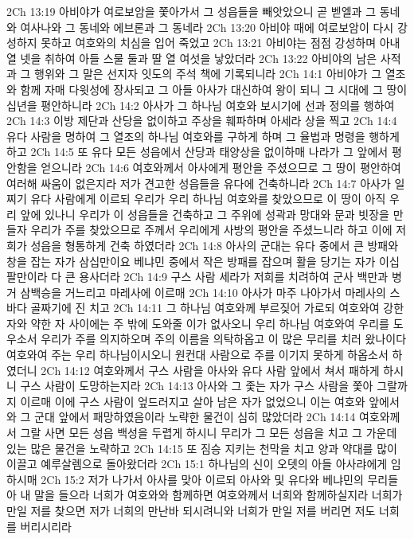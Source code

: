 2Ch 13:19  아비야가 여로보암을 쫓아가서 그 성읍들을 빼앗았으니 곧 벧엘과 그 동네와 여사나와 그 동네와 에브론과 그 동네라
2Ch 13:20  아비야 때에 여로보암이 다시 강성하지 못하고 여호와의 치심을 입어 죽었고
2Ch 13:21  아비야는 점점 강성하며 아내 열 넷을 취하여 아들 스물 둘과 딸 열 여섯을 낳았더라
2Ch 13:22  아비야의 남은 사적과 그 행위와 그 말은 선지자 잇도의 주석 책에 기록되니라
2Ch 14:1  아비야가 그 열조와 함께 자매 다윗성에 장사되고 그 아들 아사가 대신하여 왕이 되니 그 시대에 그 땅이 십년을 평안하니라
2Ch 14:2  아사가 그 하나님 여호와 보시기에 선과 정의를 행하여
2Ch 14:3  이방 제단과 산당을 없이하고 주상을 훼파하며 아세라 상을 찍고
2Ch 14:4  유다 사람을 명하여 그 열조의 하나님 여호와를 구하게 하며 그 율법과 명령을 행하게 하고
2Ch 14:5  또 유다 모든 성읍에서 산당과 태양상을 없이하매 나라가 그 앞에서 평안함을 얻으니라
2Ch 14:6  여호와께서 아사에게 평안을 주셨으므로 그 땅이 평안하여 여러해 싸움이 없은지라 저가 견고한 성읍들을 유다에 건축하니라
2Ch 14:7  아사가 일찌기 유다 사람에게 이르되 우리가 우리 하나님 여호와를 찾았으므로 이 땅이 아직 우리 앞에 있나니 우리가 이 성읍들을 건축하고 그 주위에 성곽과 망대와 문과 빗장을 만들자 우리가 주를 찾았으므로 주께서 우리에게 사방의 평안을 주셨느니라 하고 이에 저희가 성읍을 형통하게 건축 하였더라
2Ch 14:8  아사의 군대는 유다 중에서 큰 방패와 창을 잡는 자가 삼십만이요 베냐민 중에서 작은 방패를 잡으며 활을 당기는 자가 이십 팔만이라 다 큰 용사더라
2Ch 14:9  구스 사람 세라가 저희를 치려하여 군사 백만과 병거 삼백승을 거느리고 마레사에 이르매
2Ch 14:10  아사가 마주 나아가서 마레사의 스바다 골짜기에 진 치고
2Ch 14:11  그 하나님 여호와께 부르짖어 가로되 여호와여 강한 자와 약한 자 사이에는 주 밖에 도와줄 이가 없사오니 우리 하나님 여호와여 우리를 도우소서 우리가 주를 의지하오며 주의 이름을 의탁하옵고 이 많은 무리를 치러 왔나이다 여호와여 주는 우리 하나님이시오니 원컨대 사람으로 주를 이기지 못하게 하옵소서 하였더니
2Ch 14:12  여호와께서 구스 사람을 아사와 유다 사람 앞에서 쳐서 패하게 하시니 구스 사람이 도망하는지라
2Ch 14:13  아사와 그 좇는 자가 구스 사람을 쫓아 그랄까지 이르매 이에 구스 사람이 엎드러지고 살아 남은 자가 없었으니 이는 여호와 앞에서와 그 군대 앞에서 패망하였음이라 노략한 물건이 심히 많았더라
2Ch 14:14  여호와께서 그랄 사면 모든 성읍 백성을 두렵게 하시니 무리가 그 모든 성읍을 치고 그 가운데 있는 많은 물건을 노략하고
2Ch 14:15  또 짐승 지키는 천막을 치고 양과 약대를 많이 이끌고 예루살렘으로 돌아왔더라
2Ch 15:1  하나님의 신이 오뎃의 아들 아사랴에게 임하시매
2Ch 15:2  저가 나가서 아사를 맞아 이르되 아사와 및 유다와 베냐민의 무리들아 내 말을 들으라 너희가 여호와와 함께하면 여호와께서 너희와 함께하실지라 너희가 만일 저를 찾으면 저가 너희의 만난바 되시려니와 너희가 만일 저를 버리면 저도 너희를 버리시리라
